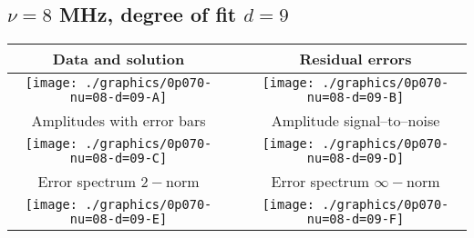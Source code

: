 

% 

\clearpage{}
\break{}

\subsection{$\nu = 8$ MHz, degree of fit $d = 9$}

\begin{table}[h]
    \begin{center}
        \begin{tabular}{ccc}
            Data and solution & \quad & Residual errors \\\hline
            \texttt{[image: ./graphics/0p070-nu=08-d=09-A]} &&
            \texttt{[image: ./graphics/0p070-nu=08-d=09-B]} \\[15pt]
            Amplitudes with error bars && Amplitude signal--to--noise \\\hline
            \texttt{[image: ./graphics/0p070-nu=08-d=09-C]} &&
            \texttt{[image: ./graphics/0p070-nu=08-d=09-D]} \\[15pt]
            Error spectrum $2-$norm && Error spectrum $\infty-$norm \\\hline
            \texttt{[image: ./graphics/0p070-nu=08-d=09-E]} &&
            \texttt{[image: ./graphics/0p070-nu=08-d=09-F]} \\[15pt]
        \end{tabular}
    \end{center}
\label{fig:elev=70, nu=8}
\end{table}



\endinput
